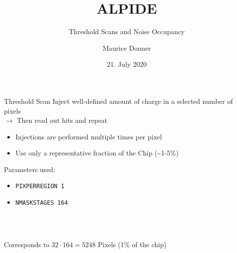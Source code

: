 \documentclass{beamer}
\title{\texorpdfstring{\color{blue!50!black}\textbf{ALPIDE}}{}}
\subtitle{Threshold Scans and Noise Occupancy}
\author{Maurice Donner}
\date{21. July 2020}
\begin{document}
\maketitle

\begin{frame}{Threshold Scan}
    Inject well-defined amount of charge in a selected number of pixels\\
    \( \rightarrow \) Then read out hits and repeat
    \begin{itemize}
	\item Injections are performed multiple times per pixel
	\item Use only a representative fraction of the Chip (\textasciitilde 1-5\%) \\[1cm]
    \end{itemize}
    \begin{minipage}{.35\textwidth}
	
    Parameters used:
    \begin{itemize}
	\item \texttt{PIXPERREGION 1}
	\item \texttt{NMASKSTAGES 164}
    \end{itemize}
    \end{minipage}
    \begin{minipage}{.05\textwidth}
	\ \\[0.5cm]
    \end{minipage}
    \begin{minipage}{.57\textwidth}
    \tiny
    \ \\[0.4cm]
    Corresponds to \( 32 \cdot 164 = 5248 \) Pixels (1\% of the chip)
    \end{minipage}
\end{frame}
\end{document}
